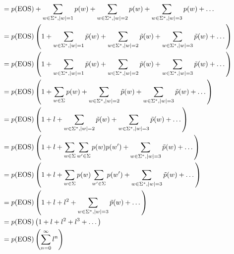 \documentclass[a4paper,12pt]{ETHexercise}
\begin{document}
\begin{question}
\begin{subquestion}
\begin{align}
			                           & = p(\eos) + \sum_{w \in \Sigma^*, |w|=1} p(w) + \sum_{w \in \Sigma^*, |w|=2} p (w) + \sum_{w \in \Sigma^*, |w|=3} p(w) + \dots                                                                                 \\
			                           & = p(\eos) \left( 1 + \sum_{w \in \Sigma^*, |w|=1} \tilde{p}(w) + \sum_{w \in \Sigma^*, |w|=2} \tilde{p}(w) + \sum_{w \in \Sigma^*, |w|=3} \tilde{p}(w) + \dots                                         \right) \\
			                           & = p(\eos) \left( 1 + \sum_{w \in \Sigma^*, |w|=1} \tilde{p}(w) + \sum_{w \in \Sigma^*, |w|=2}  \tilde{p}(w) + \sum_{w \in \Sigma^*, |w|=3}  \tilde{p}(w) + \dots  \right)                                      \\
			                           & =  p(\eos) \left( 1 + \sum_{w \in \Sigma} p(w) + \sum_{w \in \Sigma^*, |w|=2}  \tilde{p}(w) + \sum_{w \in \Sigma^*, |w|=3}  \tilde{p}(w) + \dots \right)                                                       \\
			                           & = p(\eos) \left( 1 + l + \sum_{w \in \Sigma^*, |w|=2}  \tilde{p}(w) + \sum_{w \in \Sigma^*, |w|=3}  \tilde{p}(w) + \dots  \right)                                                                              \\
			                           & = p(\eos) \left( 1 + l + \sum_{w \in \Sigma} \sum_{w' \in \Sigma} p(w)p(w') + \sum_{w \in \Sigma^*, |w|=3}  \tilde{p}(w) + \dots \right)                                                                       \\
			                           & = p(\eos) \left( 1 + l +  \sum_{w \in \Sigma} p(w) \sum_{w' \in \Sigma} p(w') + \sum_{w \in \Sigma^*, |w|=3}  \tilde{p}(w) + \dots  \right)                                                                    \\
			                           & = p(\eos) \left( 1 + l + l^2 + \sum_{w \in \Sigma^*, |w|=3}  \tilde{p}(w) + \dots   \right)                                                                                                                    \\
			                           & = p(\eos) \left( 1 + l + l^2 + l^3 + \dots     \right)                                                                                                                                                         \\
			                           & = p(\eos) \left(\sum_{n=0}^{\infty} l^n                                                 \right)                                                                                                                \\

\end{align}
\end{subquestion}
\end{question}
\end{document}
